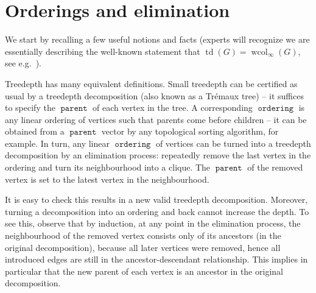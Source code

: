 \documentclass{timgad}
\title{\theTitle}
\author{Marcin Wrochna}
\affil{University of Oxford}
\date{June 2020}
\DeclareMathOperator{\td}{td}
\DeclareMathOperator{\wcol}{wcol}
\DeclareMathOperator{\parent}{\texttt{parent}}
\DeclareMathOperator{\ordering}{\texttt{ordering}}
\begin{document}
\maketitle

\begin{abstract}
	\noindent
	\href{https://github.com/marcinwrochna/sallow/releases/tag/v1.0}{github.com/marcinwrochna/sallow/releases/tag/v1.0}\\
	\href{http://doi.org/10.5281/zenodo.3870565}{10.5281/zenodo.3870565}	
	
	\medskip
	We describe a heuristic algorithm for computing treedepth decompositions, submitted for the \href{https://pacechallenge.org/2020}{PACE 2020} challenge. It relies on a variety of greedy algorithms computing elimination orderings, as well as a Divide \& Conquer approach on balanced cuts obtained using a from-scratch reimplementation of the 2016 FlowCutter algorithm by Hamann \& Strasser~\cite{HamannS18}.
\end{abstract}


\section{Orderings and elimination}
We start by recalling a few useful notions and facts (experts will recognize we are essentially describing the well-known statement that $\td(G) = \wcol_\infty(G)$, see e.g.~\cite[Lemma 6.5]{sparsityTreedepth}).

Treedepth has many equivalent definitions.
Small treedepth can be certified as usual by a treedepth decomposition (also known as a Trémaux tree) -- it suffices to specify the $\parent$ of each vertex in the tree.
A corresponding $\ordering$ is any linear ordering of vertices such that parents come before children -- it can be obtained from a $\parent$ vector by any topological sorting algorithm, for example.
In turn, any linear $\ordering$ of vertices can be turned into a treedepth decomposition by an elimination process:
repeatedly remove the last vertex in the ordering and turn its neighbourhood into a clique.
The $\parent$ of the removed vertex is set to the latest vertex in the neighbourhood.

It is easy to check this results in a new valid treedepth decomposition.
Moreover, turning a decomposition into an ordering and back cannot increase the depth.
To see this, observe that by induction, at any point in the elimination process,
the neighbourhood of the removed vertex consists only of its ancestors (in the original decomposition),
because all later vertices were removed,
hence all introduced edges are still in the ancestor-descendant relationship.
This implies in particular that the new parent of each vertex is an ancestor in the original decomposition.
\end{document}
